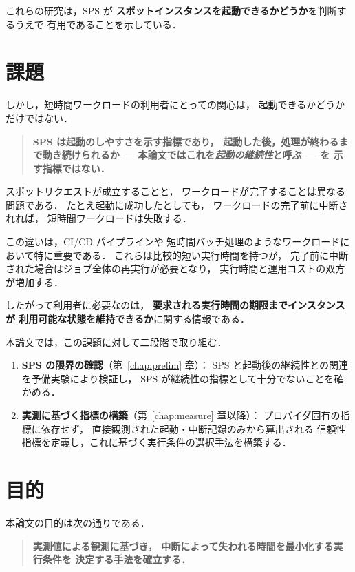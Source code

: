 \documentclass[11pt,a4paper]{ltjsreport}
\begin{document}
これらの研究は，SPS が
\textbf{スポットインスタンスを起動できるかどうか}を判断するうえで
有用であることを示している．

\section{課題}
\label{sec:problem}

しかし，短時間ワークロードの利用者にとっての関心は，
起動できるかどうかだけではない．

\begin{quote}
\textbf{SPS は起動のしやすさを示す指標であり，
起動した後，処理が終わるまで動き続けられるか
--- 本論文ではこれを\emph{起動の継続性}と呼ぶ --- を
示す指標ではない．}
\end{quote}

スポットリクエストが成立することと，
ワークロードが完了することは異なる問題である．
たとえ起動に成功したとしても，
ワークロードの完了前に中断されれば，
短時間ワークロードは失敗する．

この違いは，CI/CD パイプラインや
短時間バッチ処理のようなワークロードにおいて特に重要である．
これらは比較的短い実行時間を持つが，
完了前に中断された場合はジョブ全体の再実行が必要となり，
実行時間と運用コストの双方が増加する．

したがって利用者に必要なのは，
\textbf{要求される実行時間の期限までインスタンスが
利用可能な状態を維持できるか}に関する情報である．

本論文では，この課題に対して二段階で取り組む．

\begin{enumerate}
  \item \textbf{SPS の限界の確認}（第~\ref{chap:prelim} 章）：
        SPS と起動後の継続性との関連を予備実験により検証し，
        SPS が継続性の指標として十分でないことを確かめる．
  \item \textbf{実測に基づく指標の構築}（第~\ref{chap:measure} 章以降）：
        プロバイダ固有の指標に依存せず，
        直接観測された起動・中断記録のみから算出される
        信頼性指標を定義し，これに基づく実行条件の選択手法を構築する．
\end{enumerate}

\section{目的}
\label{sec:objective}

本論文の目的は次の通りである．

\begin{quote}
\textbf{実測値による観測に基づき，
中断によって失われる時間を最小化する実行条件を
決定する手法を確立する．}
\end{quote}
\end{document}
